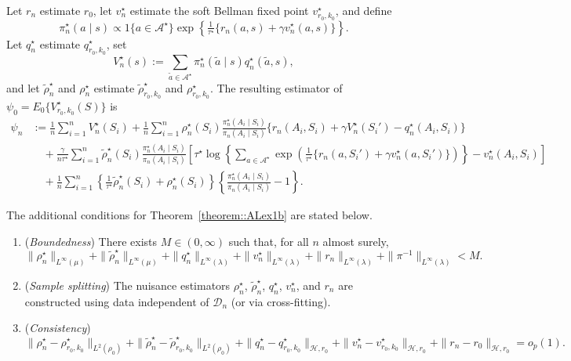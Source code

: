 \documentclass[11pt]{article}
\theoremstyle{plain}
\begin{document}
Let \(r_n\) estimate \(r_0\), let \(v_n^\star\) estimate the soft Bellman
fixed point \(v_{r_0,k_0}^\star\), and define
\[
\pi_n^\star(a\mid s)
\propto
1\{a\in\mathcal A^\star\}
\exp\!\left\{
\tfrac{1}{\tau^\star}\{r_n(a,s)+\gamma v_n^\star(a,s)\}
\right\}.
\]
Let \(q_n^\star\) estimate \(q_{r_0,k_0}^\star\), set
\[
V_n^\star(s)
:=
\sum_{\tilde a\in\mathcal A^\star}
\pi_n^\star(\tilde a\mid s)q_n^\star(\tilde a,s),
\]
and let \(\widetilde\rho_n^\star\) and \(\rho_n^\star\) estimate
\(\widetilde\rho_{r_0,k_0}^\star\) and \(\rho_{r_0,k_0}^\star\). The resulting
estimator of \(\psi_0=E_0\{V_{r_0,k_0}^\star(S)\}\) is
\begin{align*}
\psi_n
&:=
\frac{1}{n}\sum_{i=1}^n V_n^\star(S_i)
+
\frac{1}{n}\sum_{i=1}^n
\rho_n^\star(S_i)
\frac{\pi_n^\star(A_i\mid S_i)}{\pi_n(A_i\mid S_i)}
\{r_n(A_i,S_i)+\gamma V_n^\star(S_i')-q_n^\star(A_i,S_i)\}
\\
&\quad+
\frac{\gamma}{n\tau^\star}\sum_{i=1}^n
\widetilde\rho_n^\star(S_i)
\frac{\pi_n^\star(A_i\mid S_i)}{\pi_n(A_i\mid S_i)}
\left[
\tau^\star
\log\!\left\{
\sum_{a\in\mathcal A^\star}
\exp\!\left(
\tfrac{1}{\tau^\star}\{r_n(a,S_i')+\gamma v_n^\star(a,S_i')\}
\right)
\right\}
-
v_n^\star(A_i,S_i)
\right]
\\
&\quad+
\frac{1}{n}\sum_{i=1}^n
\left\{
\tfrac{1}{\tau^\star}\widetilde\rho_n^\star(S_i)
+
\rho_n^\star(S_i)
\right\}
\left\{
\frac{\pi_n^\star(A_i\mid S_i)}{\pi_n(A_i\mid S_i)}-1
\right\}.
\end{align*}

The additional conditions for Theorem~\ref{theorem::ALex1b} are stated below.
\begin{enumerate}[label=\textbf{(E\arabic**)}, ref=E\arabic**, resume = efficiency1b]
    \item \label{assump:boundedness::softstar}(\textit{Boundedness})
    There exists $M \in (0,\infty)$ such that, for all $n$ almost surely,
    \[
      \|\rho_n^\star\|_{L^\infty(\mu)}
      + \|\widetilde{\rho}_n^\star\|_{L^\infty(\mu)}
      + \|q_n^\star\|_{L^\infty(\lambda)}
      + \|v_n^\star\|_{L^\infty(\lambda)}
      + \|r_n\|_{L^\infty(\lambda)}
      + \|\pi^{-1}\|_{L^\infty(\lambda)}
      < M.
    \]

    \item \label{assump:splitting::softstar}(\textit{Sample splitting})
    The nuisance estimators $\rho_n^\star$, $\widetilde{\rho}_n^\star$, $q_n^\star$, $v_n^\star$, and $r_n$
    are constructed using data independent of $\mathcal{D}_n$ (or via cross-fitting).

    \item \label{assump:consistency::softstar}(\textit{Consistency})
    \[
      \|\rho_n^\star - \rho_{r_0,k_0}^\star\|_{L^2(\rho_0)}
      + \|\widetilde{\rho}_n^\star - \widetilde{\rho}_{r_0,k_0}^\star\|_{L^2(\rho_0)}
      + \|q_n^\star - q_{r_0,k_0}^\star\|_{\mathcal{H},r_0}
      + \|v_n^\star - v_{r_0,k_0}^\star\|_{\mathcal{H},r_0}
      + \|r_n - r_0\|_{\mathcal{H},r_0}
      = o_p(1).
    \]
\end{enumerate}
\end{document}
